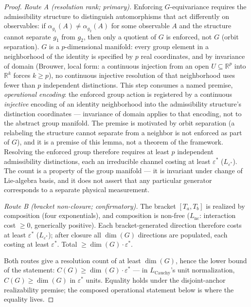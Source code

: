 \documentclass[11pt]{article}
\theoremstyle{definition}
\begin{document}
\begin{proof}
\textit{Route A (resolution rank; primary).}\quad
Enforcing $G$-equivariance requires the admissibility structure to
distinguish automorphisms that act differently on observables: if
$\alpha_{g_1}(A) \ne \alpha_{g_2}(A)$ for some observable $A$ and the
structure cannot separate $g_1$ from $g_2$, then only a quotient of
$G$ is enforced, not $G$ (orbit separation).  $G$ is a $p$-dimensional
manifold: every group element in a neighborhood of the identity is
specified by $p$ real coordinates, and by invariance of domain
(Brouwer, local form: a continuous injection from an open
$U \subseteq \mathbb{R}^p$ into $\mathbb{R}^k$ forces $k \ge p$), no
continuous injective resolution of that neighborhood uses fewer than
$p$ independent distinctions.  This step consumes a named premise,
\emph{operational encoding}: the enforced group action is registered
by a continuous \emph{injective} encoding of an identity neighborhood
into the admissibility structure's distinction coordinates ---
invariance of domain applies to that encoding, not to the abstract
group manifold.  The premise is motivated by orbit separation (a
relabeling the structure cannot separate from a neighbor is not
enforced as part of $G$), and it is a premise of this lemma, not a
theorem of the framework.  Resolving the enforced group therefore
requires at least $p$ independent admissibility distinctions, each an
irreducible channel costing at least $\varepsilon^*$
($L_{\varepsilon^*}$).  The count is a property of the group manifold
--- it is invariant under change of Lie-algebra basis, and it does not
assert that any particular generator corresponds to a separate
physical measurement.

\textit{Route B (bracket non-closure; confirmatory).}\quad
The bracket $[T_a, T_b]$ is realized by composition (four
exponentials), and composition is non-free ($L_{\mathrm{nc}}$:
interaction cost $\ge 0$, generically positive).  Each
bracket-generated direction therefore costs at least $\varepsilon^*$
($L_{\varepsilon^*}$); after closure all $\dim(G)$ directions are
populated, each costing at least $\varepsilon^*$.  Total
$\ge \dim(G)\cdot\varepsilon^*$.

Both routes give a resolution count of at least $\dim(G)$, hence the
lower bound of the statement: $C(G) \ge \dim(G)\cdot\varepsilon^*$ ---
in $L_{\mathrm{Cauchy}}$'s unit normalization, $C(G) \ge \dim(G)$ in
$\varepsilon^*$ units.  Equality holds under the disjoint-anchor
realizability premise; the composed operational statement below is
where the equality lives.
\end{proof}
\end{document}
